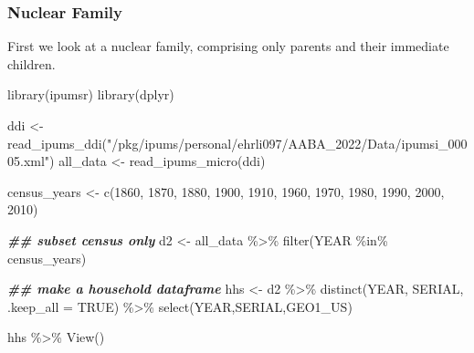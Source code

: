 \documentclass[
]{book}
\newenvironment{Shaded}{\begin{snugshade}}{\end{snugshade}}
\newcommand{\AttributeTok}[1]{\textcolor[rgb]{0.77,0.63,0.00}{#1}}
\newcommand{\ConstantTok}[1]{\textcolor[rgb]{0.00,0.00,0.00}{#1}}
\newcommand{\DecValTok}[1]{\textcolor[rgb]{0.00,0.00,0.81}{#1}}
\newcommand{\DocumentationTok}[1]{\textcolor[rgb]{0.56,0.35,0.01}{\textbf{\textit{#1}}}}
\newcommand{\FunctionTok}[1]{\textcolor[rgb]{0.00,0.00,0.00}{#1}}
\newcommand{\NormalTok}[1]{#1}
\newcommand{\OtherTok}[1]{\textcolor[rgb]{0.56,0.35,0.01}{#1}}
\newcommand{\SpecialCharTok}[1]{\textcolor[rgb]{0.00,0.00,0.00}{#1}}
\newcommand{\StringTok}[1]{\textcolor[rgb]{0.31,0.60,0.02}{#1}}
\begin{document}
\hypertarget{nuclear-family}{%
\subsubsection{Nuclear Family}\label{nuclear-family}}

First we look at a nuclear family, comprising only parents and their immediate children.

\begin{Shaded}
\begin{Highlighting}[]
\FunctionTok{library}\NormalTok{(ipumsr)}
\FunctionTok{library}\NormalTok{(dplyr)}

\NormalTok{ddi }\OtherTok{\textless{}{-}} \FunctionTok{read\_ipums\_ddi}\NormalTok{(}\StringTok{"/pkg/ipums/personal/ehrli097/AABA\_2022/Data/ipumsi\_00005.xml"}\NormalTok{)}
\NormalTok{all\_data }\OtherTok{\textless{}{-}} \FunctionTok{read\_ipums\_micro}\NormalTok{(ddi)}

\NormalTok{census\_years }\OtherTok{\textless{}{-}} \FunctionTok{c}\NormalTok{(}\DecValTok{1860}\NormalTok{, }\DecValTok{1870}\NormalTok{, }\DecValTok{1880}\NormalTok{, }\DecValTok{1900}\NormalTok{, }\DecValTok{1910}\NormalTok{, }\DecValTok{1960}\NormalTok{, }\DecValTok{1970}\NormalTok{, }\DecValTok{1980}\NormalTok{, }\DecValTok{1990}\NormalTok{, }\DecValTok{2000}\NormalTok{, }\DecValTok{2010}\NormalTok{)}

\DocumentationTok{\#\# subset census only}
\NormalTok{d2 }\OtherTok{\textless{}{-}}\NormalTok{ all\_data }\SpecialCharTok{\%\textgreater{}\%} \FunctionTok{filter}\NormalTok{(YEAR }\SpecialCharTok{\%in\%}\NormalTok{ census\_years)}

\DocumentationTok{\#\# make a household dataframe}
\NormalTok{hhs }\OtherTok{\textless{}{-}}\NormalTok{ d2 }\SpecialCharTok{\%\textgreater{}\%} \FunctionTok{distinct}\NormalTok{(YEAR, SERIAL, }\AttributeTok{.keep\_all =} \ConstantTok{TRUE}\NormalTok{) }\SpecialCharTok{\%\textgreater{}\%} \FunctionTok{select}\NormalTok{(YEAR,SERIAL,GEO1\_US)}

\NormalTok{hhs }\SpecialCharTok{\%\textgreater{}\%} \FunctionTok{View}\NormalTok{()}
\end{Highlighting}
\end{Shaded}
\end{document}
